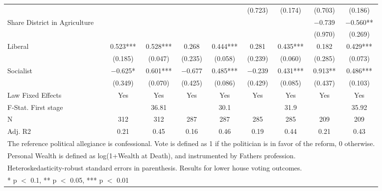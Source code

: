 \begin{table}
\begin{tabular}[t]{lcccccccc}
 &  &  &  &  & (\num{0.723}) & (\num{0.174}) & (\num{0.703}) & (\num{0.186})\\
Share District in Agriculture &  &  &  &  &  &  & \num{-0.739} & \num{-0.560}**\\
 &  &  &  &  &  &  & (\num{0.970}) & (\num{0.269})\\
Liberal & \num{0.523}*** & \num{0.528}*** & \num{0.268} & \num{0.444}*** & \num{0.281} & \num{0.435}*** & \num{0.182} & \num{0.429}***\\
 & (\num{0.185}) & (\num{0.047}) & (\num{0.235}) & (\num{0.058}) & (\num{0.239}) & (\num{0.060}) & (\num{0.285}) & (\num{0.073})\\
Socialist & \num{-0.625}* & \num{0.601}*** & \num{-0.677} & \num{0.485}*** & \num{-0.239} & \num{0.431}*** & \num{0.913}** & \num{0.486}***\\
 & (\num{0.349}) & (\num{0.070}) & (\num{0.425}) & (\num{0.086}) & (\num{0.429}) & (\num{0.085}) & (\num{0.437}) & (\num{0.103})\\
\midrule
Law Fixed Effects & Yes & Yes & Yes & Yes & Yes & Yes & Yes & Yes\\
F-Stat. First stage &  & 36.81 &  & 30.1 &  & 31.9 &  & 35.92\\
N & \num{312} & \num{312} & \num{287} & \num{287} & \num{285} & \num{285} & \num{209} & \num{209}\\
Adj. R2 & \num{0.21} & \num{0.45} & \num{0.16} & \num{0.46} & \num{0.19} & \num{0.44} & \num{0.21} & \num{0.43}\\
\bottomrule
\multicolumn{9}{l}{\rule{0pt}{1em}The reference political allegiance is confessional. Vote is defined as 1 if the politician is in favor of the reform, 0 otherwise.}\\
\multicolumn{9}{l}{\rule{0pt}{1em}Personal Wealth is defined as log(1+Wealth at Death), and instrumented by Fathers profession.}\\
\multicolumn{9}{l}{\rule{0pt}{1em}Heteroskedasticity-robust standard errors in parenthesis. Results for lower house voting outcomes.}\\
\multicolumn{9}{l}{\rule{0pt}{1em}* p $<$ 0.1, ** p $<$ 0.05, *** p $<$ 0.01}\\
\end{tabular}
\end{table}
